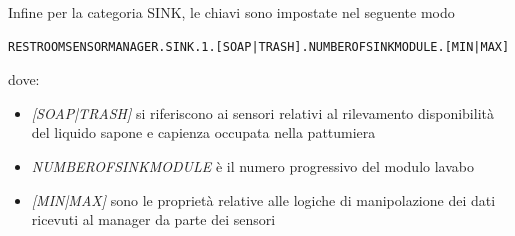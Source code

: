 \documentclass[12pt]{article}
\begin{document}
Infine per la categoria SINK, le chiavi sono impostate nel seguente modo
\begin{lstlisting}
RESTROOMSENSORMANAGER.SINK.1.[SOAP|TRASH].NUMBEROFSINKMODULE.[MIN|MAX]
\end{lstlisting}
dove:
\begin{itemize}
\item \textit{[SOAP|TRASH]} si riferiscono ai sensori relativi al rilevamento disponibilità del liquido sapone e capienza occupata nella pattumiera
\item \textit{NUMBEROFSINKMODULE} è il numero progressivo del modulo lavabo
\item \textit {[MIN|MAX]} sono le proprietà relative alle logiche di manipolazione dei dati ricevuti al manager da parte dei sensori
\end{itemize}
\end{document}
